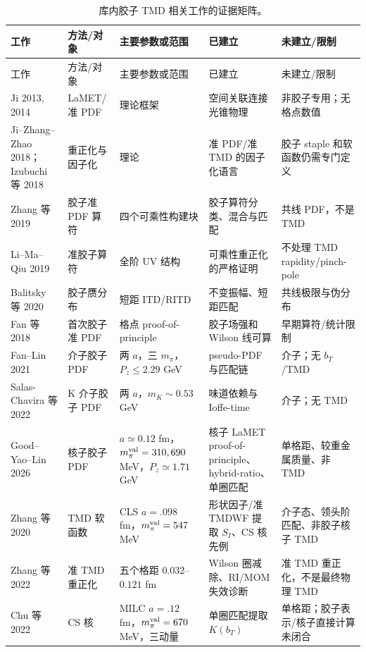 \documentclass[UTF8,12pt,a4paper,twoside,openany]{ctexbook}
\begin{document}
\begin{footnotesize}
\begin{longtable}{L{2.6cm}L{2.0cm}L{2.7cm}L{2.6cm}L{2.7cm}}
\caption{库内胶子 TMD 相关工作的证据矩阵。}\label{tab:publication-matrix}\\
\toprule
工作 & 方法/对象 & 主要参数或范围 & 已建立 & 未建立/限制 \\
\midrule
\endfirsthead
\toprule
工作 & 方法/对象 & 主要参数或范围 & 已建立 & 未建立/限制 \\
\midrule
\endhead
Ji 2013, 2014\cite{Ji2013,Ji2014} & LaMET/准 PDF & 理论框架 & 空间关联连接光锥物理 & 非胶子专用；无格点数值 \\
Ji--Zhang--Zhao 2018；Izubuchi 等 2018\cite{JiZhangZhao2018,Izubuchi2018} & 重正化与因子化 & 理论 & 准 PDF/准 TMD 的因子化语言 & 胶子 staple 和软函数仍需专门定义 \\
Zhang 等 2019\cite{ZhangGluonLaMET2019} & 胶子准 PDF 算符 & 四个可乘性构建块 & 胶子算符分类、混合与匹配 & 共线 PDF，不是 TMD \\
Li--Ma--Qiu 2019\cite{LiMaQiu2019} & 准胶子算符 & 全阶 UV 结构 & 可乘性重正化的严格证明 & 不处理 TMD rapidity/pinch-pole \\
Balitsky 等 2020\cite{Balitsky2020} & 胶子赝分布 & 短距 ITD/RITD & 不变振幅、短距匹配 & 共线极限与伪分布 \\
Fan 等 2018\cite{FanQuasiGluon2018} & 首次胶子准 PDF & 格点 proof-of-principle & 胶子场强和 Wilson 线可算 & 早期算符/统计限制 \\
Fan--Lin 2021\cite{FanLinPion2021} & 介子胶子 PDF & 两 \(a\)，三 \(m_\pi\)，\(P_z\le2.29\) GeV & pseudo-PDF 与匹配链 & 介子；无 \(b_T\)/TMD \\
Salas-Chavira 等 2022\cite{SalasChavira2022} & K 介子胶子 PDF & 两 \(a\)，\(m_K\sim0.53\) GeV & 味道依赖与 Ioffe-time & 介子；无 TMD \\
Good--Yao--Lin 2026\cite{GoodYaoLin2026} & 核子胶子 PDF & \(a\simeq0.12\) fm，\(m_\pi^{\rm val}=310,690\) MeV，\(P_z\simeq1.71\) GeV & 核子 LaMET proof-of-principle、hybrid-ratio、单圈匹配 & 单格距、较重金属质量、非 TMD \\
Zhang 等 2020\cite{ZhangSoft2020} & TMD 软函数 & CLS \(a=.098\) fm，\(m_\pi^{\rm val}=547\) MeV & 形状因子/准 TMDWF 提取 \(S_I\)、CS 核先例 & 介子态、领头阶匹配、非胶子核子 TMD \\
Zhang 等 2022\cite{Zhang2022TMD} & 准 TMD 重正化 & 五个格距 \(0.032\)--\(0.121\) fm & Wilson 圈减除、RI/MOM 失效诊断 & 准 TMD 重正化，不是最终物理 TMD \\
Chu 等 2022\cite{ChuCS2022} & CS 核 & MILC \(a=.12\) fm，\(m_\pi^{\rm val}=670\) MeV，三动量 & 单圈匹配提取 \(K(b_T)\) & 单格距；胶子表示/核子直接计算未闭合 \\

\end{longtable}
\end{footnotesize}
\end{document}
